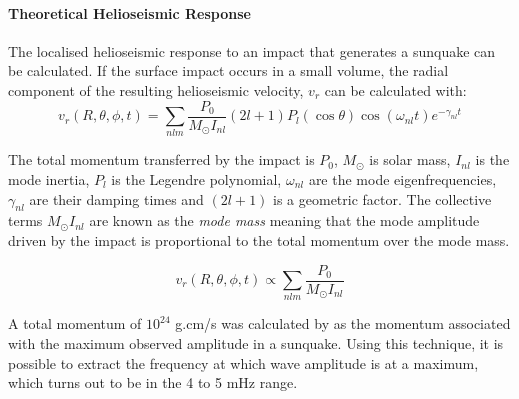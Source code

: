 \paragraph{Theoretical Helioseismic Response}\label{helioresp}
The localised helioseismic response to an impact that generates a sunquake can be calculated. If the surface impact occurs in a small volume, the radial component of the resulting helioseismic velocity, $v_r$ can be calculated with:
\begin{equation}
v_{r}(R, \theta, \phi, t) = \sum_{nlm} \frac{P_{0}}{M_{\odot}I_{nl}}(2l+1)P_{l}(\cos\theta)\cos(\omega_{nl}t)e^{-\gamma_{nl}t}
\end{equation}

The total momentum transferred by the impact is $P_{0}$, $M_{\odot}$ is solar mass, $I_{nl}$ is the mode inertia, $P_{l}$ is the Legendre polynomial, $\omega_{nl}$ are the mode eigenfrequencies, $\gamma_{nl}$ are their damping times and $(2l+1)$ is a geometric factor. The collective terms $M_{\odot}I_{nl}$ are known as the \emph{mode mass} meaning that the mode amplitude driven by the impact is proportional to the total momentum over the mode mass.    

\begin{equation}
v_{r}(R, \theta, \phi, t) \propto \sum_{nlm} \frac{P_{0}}{M_{\odot}I_{nl}}
\end{equation}

A total momentum of $10^{24}$ g.cm/s was calculated by \cite{2009AIPC.1170..547K} as the momentum associated with the maximum observed amplitude in a sunquake. Using this technique, it is possible to extract the frequency at which wave amplitude is at a maximum, which turns out to be in the 4 to 5 mHz range.

